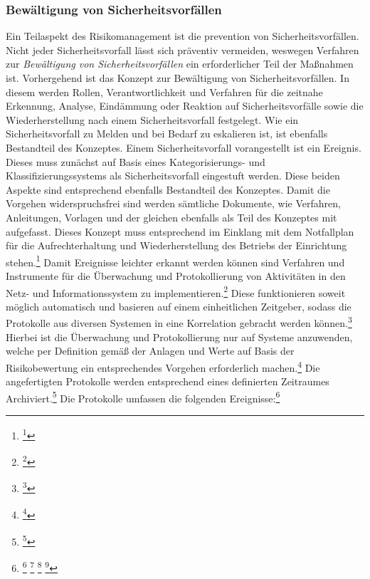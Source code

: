 \documentclass[11pt,a4paper,hidelinks]{article}   %
\begin{document}
            \subsubsection{Bewältigung von Sicherheitsvorfällen}
            Ein Teilaspekt des Risikomanagement ist die prevention von Sicherheitsvorfällen. Nicht jeder Sicherheitsvorfall lässt sich präventiv vermeiden, weswegen Verfahren zur \emph{Bewältigung von Sicherheitsvorfällen} ein erforderlicher Teil der Maßnahmen ist. Vorhergehend ist das Konzept zur Bewältigung von Sicherheitsvorfällen. In diesem werden Rollen, Verantwortlichkeit und Verfahren für die zeitnahe Erkennung, Analyse, Eindämmung oder Reaktion auf Sicherheitsvorfälle sowie die Wiederherstellung nach einem Sicherheitsvorfall festgelegt. Wie ein Sicherheitsvorfall zu Melden und bei Bedarf zu eskalieren ist, ist ebenfalls Bestandteil des Konzeptes. Einem Sicherheitsvorfall vorangestellt ist ein Ereignis. Dieses muss zunächst auf Basis eines Kategorisierungs- und Klassifizierungssystems als Sicherheitsvorfall eingestuft werden. Diese beiden Aspekte sind entsprechend ebenfalls Bestandteil des Konzeptes. Damit die Vorgehen widerspruchsfrei sind werden sämtliche Dokumente, wie Verfahren, Anleitungen, Vorlagen und der gleichen ebenfalls als Teil des Konzeptes mit aufgefasst. Dieses Konzept muss entsprechend im Einklang mit dem Notfallplan für die Aufrechterhaltung und Wiederherstellung des Betriebs der Einrichtung stehen.\footnote{\footcite[Vgl.][, Anhang, Nummer 3.1.1. \& 3.1.2.]{EU2024-2690}} Damit Ereignisse leichter erkannt werden können sind Verfahren und Instrumente für die Überwachung und Protokollierung von Aktivitäten in den Netz- und Informationssystem zu implementieren.\footnote{\footcite[Vgl.][, Anhang, Nummer 3.2.1.]{EU2024-2690}} Diese funktionieren soweit möglich automatisch und basieren auf einem einheitlichen Zeitgeber, sodass die Protokolle aus diversen Systemen in eine Korrelation gebracht werden können.\footnote{\footcite[Vgl.][, Anhang, Nummer 3.2.2. \& 3.2.6.]{EU2024-2690}} Hierbei ist die Überwachung und Protokollierung nur auf Systeme anzuwenden, welche per Definition gemäß der Anlagen und Werte auf Basis der Risikobewertung ein entsprechendes Vorgehen erforderlich machen.\footnote{\footcite[Vgl.][, Anhang, Nummer 3.2.6.]{EU2024-2690}} Die angefertigten Protokolle werden entsprechend eines definierten Zeitraumes Archiviert.\footnote{\footcite[Vgl.][, Anhang, Nummer 3.2.5.]{EU2024-2690}} Die Protokolle umfassen die folgenden Ereignisse:\footnote{
                \footcite[Vgl.][, Anhang, Nummer 3.2.3.]{EU2024-2690}
                \footcite[Vgl.][, Artikel 21, Absatz 1]{EU2022-2555}
                \footcite[Vgl.][, §30 Absatz 2, Nummer 2]{NIS2UmsuCG} %
                \footcite[Vgl.][, S. 44]{nist-sp800-39}
            }
\end{document}
